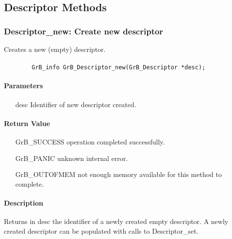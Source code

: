 \subsection{Descriptor Methods}

\subsubsection{{\sf Descriptor\_new}: Create new descriptor}

Creates a new (empty) descriptor.

\paragraph{\syntax}

\begin{verbatim}
        GrB_info GrB_Descriptor_new(GrB_Descriptor *desc);
\end{verbatim}

\paragraph{Parameters}

\begin{itemize}[leftmargin=1.1in]
    \item[{\sf desc}] Identifier of new descriptor created.
\end{itemize}

\paragraph{Return Value}

\begin{itemize}[leftmargin=2.1in]
\item[{\sf GrB\_SUCCESS}]           operation completed successfully.
\item[{\sf GrB\_PANIC}]             unknown internal error.
\item[{\sf GrB\_OUTOFMEM}]          not enough memory available for this method to complete.
\end{itemize}

\paragraph{Description}

Returns in {\sf desc} the identifier of a newly created empty descriptor.
A newly created descriptor can be populated with calls to {\sf Descriptor\_set}.


